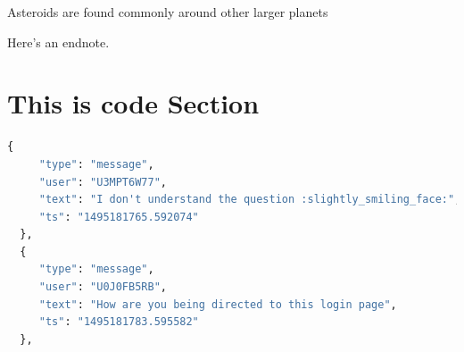 \lipsum[3] Asteroids are found commonly around other larger planets

\lipsum[4-5] 

Here's an endnote.

\section{This is code Section}

\begin{lstlisting}[language=Python, caption=JSON example]
 {
     "type": "message",
     "user": "U3MPT6W77",
     "text": "I don't understand the question :slightly_smiling_face:",
     "ts": "1495181765.592074"
  },
  {
     "type": "message",
     "user": "U0J0FB5RB",
     "text": "How are you being directed to this login page",
     "ts": "1495181783.595582"
  },
\end{lstlisting}